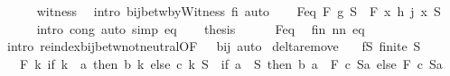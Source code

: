 \begin{isabellebody}
\ \ \ \ \isamarkupfalse%
\ witness\ \isamarkupfalse%
\ {\isacharparenleft}{\kern0pt}intro\ bij{\isacharunderscore}{\kern0pt}betw{\isacharunderscore}{\kern0pt}byWitness{\isacharbrackleft}{\kern0pt}\ f{\isacharprime}{\kern0pt}{\isacharequal}{\kern0pt}i{\isacharbrackright}{\kern0pt}{\isacharparenright}{\kern0pt}\ auto\isanewline
\ \ \isamarkupfalse%
\ F{\isacharunderscore}{\kern0pt}eq{\isacharcolon}{\kern0pt}\ {\isachardoublequoteopen}F\ g\ S\ {\isacharequal}{\kern0pt}\ F\ {\isacharparenleft}{\kern0pt}{\isasymlambda}x{\isachardot}{\kern0pt}\ h\ {\isacharparenleft}{\kern0pt}j\ x{\isacharparenright}{\kern0pt}{\isacharparenright}{\kern0pt}\ S{\isachardoublequoteclose}\isanewline
\ \ \ \ \isamarkupfalse%
\ {\isacharparenleft}{\kern0pt}intro\ cong{\isacharparenright}{\kern0pt}\ {\isacharparenleft}{\kern0pt}auto\ simp{\isacharcolon}{\kern0pt}\ eq{\isacharparenright}{\kern0pt}\isanewline
\ \ \isamarkupfalse%
\ {\isacharquery}{\kern0pt}thesis\isanewline
\ \ \ \ \isamarkupfalse%
\ F{\isacharunderscore}{\kern0pt}eq\ \isamarkupfalse%
\ fin\ nn\ eq\isanewline
\ \ \ \ \isamarkupfalse%
\ {\isacharparenleft}{\kern0pt}intro\ reindex{\isacharunderscore}{\kern0pt}bij{\isacharunderscore}{\kern0pt}betw{\isacharunderscore}{\kern0pt}not{\isacharunderscore}{\kern0pt}neutral{\isacharbrackleft}{\kern0pt}OF\ {\isacharunderscore}{\kern0pt}\ {\isacharunderscore}{\kern0pt}\ bij{\isacharbrackright}{\kern0pt}{\isacharparenright}{\kern0pt}\ auto\isanewline
{}\isamarkupfalse%
%
\endisatagproof
{\isafoldproof}%
%
\isadelimproof
\isanewline
%
\endisadelimproof
\isanewline
{}\isamarkupfalse%
\ delta{\isacharunderscore}{\kern0pt}remove{\isacharcolon}{\kern0pt}\isanewline
\ \ \ fS{\isacharcolon}{\kern0pt}\ {\isachardoublequoteopen}finite\ S{\isachardoublequoteclose}\isanewline
\ \ \ {\isachardoublequoteopen}F\ {\isacharparenleft}{\kern0pt}{\isasymlambda}k{\isachardot}{\kern0pt}\ if\ k\ {\isacharequal}{\kern0pt}\ a\ then\ b\ k\ else\ c\ k{\isacharparenright}{\kern0pt}\ S\ {\isacharequal}{\kern0pt}\ {\isacharparenleft}{\kern0pt}if\ a\ {\isasymin}\ S\ then\ b\ a\ \isactrlbold {\isacharasterisk}{\kern0pt}\ F\ c\ {\isacharparenleft}{\kern0pt}S{\isacharminus}{\kern0pt}{\isacharbraceleft}{\kern0pt}a{\isacharbraceright}{\kern0pt}{\isacharparenright}{\kern0pt}\ else\ F\ c\ {\isacharparenleft}{\kern0pt}S{\isacharminus}{\kern0pt}{\isacharbraceleft}{\kern0pt}a{\isacharbraceright}{\kern0pt}{\isacharparenright}{\kern0pt}{\isacharparenright}{\kern0pt}{\isachardoublequoteclose}\isanewline

\end{isabellebody}
